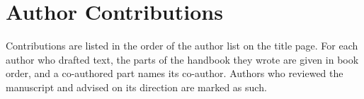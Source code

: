 \clearpage
\section*{Author Contributions}
\label{sec:author-contribution-list-author-contributions}

Contributions are listed in the order of the author list on the title page. For each author who drafted text, the parts of the handbook they wrote are given in book order, and a co-authored part names its co-author. Authors who reviewed the manuscript and advised on its direction are marked as such.

